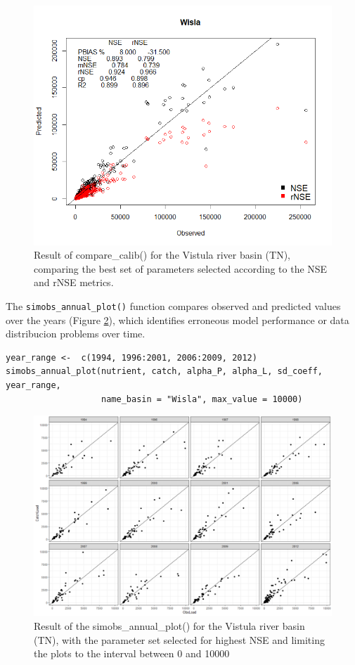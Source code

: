 \begin{figure}[H]
\includegraphics[width=1\linewidth,height=0.45\textheight]{figures/fig6} \caption{Result of compare\_calib() for the Vistula river basin (TN), comparing the best set of parameters selected according to the NSE and rNSE metrics.}\label{fig:compare-calib-vistula-river}
\end{figure}

\noindent The \texttt{simobs\_annual\_plot()} function compares observed and predicted values over the years (Figure \ref{fig:simobs-annual-plot-vistula-river}), which identifies erroneous model performance or data distribucion problems over time.

\begin{verbatim}
year_range <-  c(1994, 1996:2001, 2006:2009, 2012)      
simobs_annual_plot(nutrient, catch, alpha_P, alpha_L, sd_coeff, year_range, 
                   name_basin = "Wisla", max_value = 10000)
\end{verbatim}

\begin{figure}[H]
\includegraphics[width=1\linewidth,height=0.3\textheight]{figures/fig7} \caption{Result of the simobs\_annual\_plot() for the Vistula river basin (TN), with the parameter set selected for highest NSE and limiting the plots to the interval between 0 and 10000}\label{fig:simobs-annual-plot-vistula-river}
\end{figure}


